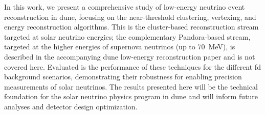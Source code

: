 In this work, we present a comprehensive study of low-energy neutrino event reconstruction in \gls{dune}, focusing on the near-threshold clustering, vertexing, and energy reconstruction algorithms. This is the cluster-based reconstruction stream targeted at solar neutrino energies; the complementary Pandora-based stream, targeted at the higher energies of supernova neutrinos (up to \SI{70}{\mega\electronvolt}), is described in the accompanying \gls{dune} low-energy reconstruction paper and is not covered here. Evaluated is the performance of these techniques for the different \gls{fd} background scenarios, demonstrating their robustness for enabling precision measurements of solar neutrinos. The results presented here will be the technical foundation for the solar neutrino physics program in \gls{dune} and will inform future analyses and detector design optimization.


